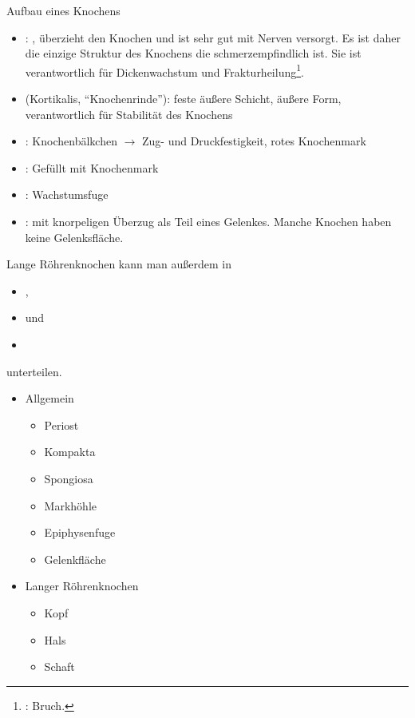 \TextSlide
{Aufbau eines Knochens}
{%
\begin{itemize}
  \item {}: , überzieht den Knochen und
  ist sehr gut mit Nerven versorgt. Es ist daher die einzige Struktur des Knochens die
  schmerzempfindlich ist. Sie ist verantwortlich für
  Dickenwachstum und Frakturheilung\footnote{:
  Bruch.}.
  \item {} (Kortikalis, \protect\enquote{Knochenrinde}):
  feste äußere Schicht, äußere Form, verantwortlich für Stabilität des Knochens
  \item {}: Knochenbälkchen
  ${\rightarrow}$ Zug- und Druckfestigkeit, rotes Knochenmark
  \item {}: Gefüllt mit Knochenmark
  \item {}:  Wachstumsfuge
  \item {}: mit knorpeligen Überzug als Teil eines Gelenkes.
  Manche Knochen haben keine Gelenksfläche.
\end{itemize}
Lange Röhrenknochen kann man außerdem in 
\begin{itemize}
    \item {},
    \item {} und
    \item {} 
\end{itemize}
unterteilen.
}{
\begin{itemize}
  \item Allgemein
  \begin{itemize}
    \item Periost
    \item Kompakta
    \item Spongiosa
    \item Markhöhle
    \item Epiphysenfuge
    \item Gelenkfläche
  \end{itemize}
  \item Langer Röhrenknochen
  \begin{itemize}
    \item {Kopf}
    \item {Hals}
    \item {Schaft}
  \end{itemize}
\end{itemize}
}




